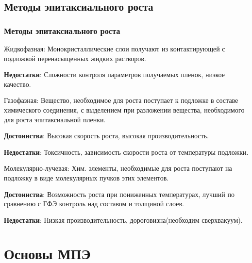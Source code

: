 \documentclass[10pt,pdf,hyperref={unicode}, dvipsnames]{beamer}
\begin{document}
\subsection{Методы эпитаксиального роста}
\begin{frame}[t]
	\frametitle{Методы эпитаксиального роста}
	\vspace{10pt}

	Жидкофазная: Монокристаллические слои получают из контактирующей с подложкой перенасыщенных жидких растворов.

	\textbf{Недостатки}: Сложности контроля параметров получаемых пленок, низкое качество. 
	\vspace{10pt}

	Газофазная: Вещество, необходимое для роста поступает к подложке в составе химического соединения, с выделением при
	разложении вещества, необходимого для роста эпитаксиальной пленки.

	\textbf{Достоинства}: Высокая скорость роста, высокая производительность.

	\textbf{Недостатки}: Токсичность, зависимость скорости роста от температуры подложки.
	\vspace{10pt}

	Молекулярно-лучевая: Хим. элементы, необходимые для роста поступают на подложку в виде молекулярных пучков этих
	элементов.
	
	\textbf{Достоинства}: Возможность роста при пониженных температурах, лучший по сравнению с ГФЭ контроль над составом и
	толщиной слоев.

	\textbf{Недостатки}: Низкая производительность, дороговизна(необходим сверхвакуум).
\end{frame}

\section{Основы МПЭ}
\end{document}
